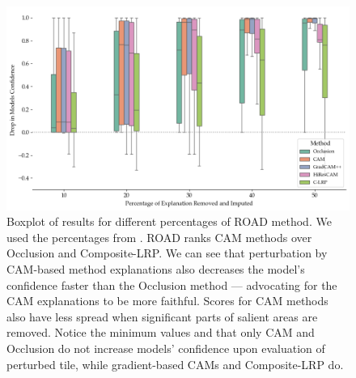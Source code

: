 \begin{figure}
    \begin{center}
    \begin{minipage}{1\textwidth}
      \includegraphics[width=\textwidth]{img/road-boxplot.png}
    \end{minipage}
    \caption{Boxplot of results for different percentages of ROAD method. We used the percentages from \cite{road}. ROAD ranks CAM methods over Occlusion and Composite-LRP. We can see that perturbation by CAM-based method explanations also decreases the model's confidence faster than the Occlusion method --- advocating for the CAM explanations to be more faithful. Scores for CAM methods also have less spread when significant parts of salient areas are removed. Notice the minimum values and that only CAM and Occlusion do not increase models' confidence upon evaluation of perturbed tile, while gradient-based CAMs and Composite-LRP do.}
    \label{fig:road-boxplot}
    \end{center}
\end{figure}

